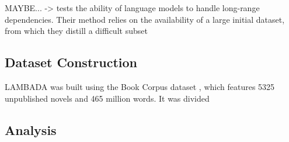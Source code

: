 MAYBE... -> tests the ability of language models to handle long-range dependencies. Their method relies on the availability of a large initial dataset, from which they distill a difficult subset

\subsection{Dataset Construction}

LAMBADA was built using the Book Corpus dataset \cite{zhu2015aligning}, which features 5325 unpublished novels and 465 million words. It was divided

\subsection{Analysis}

